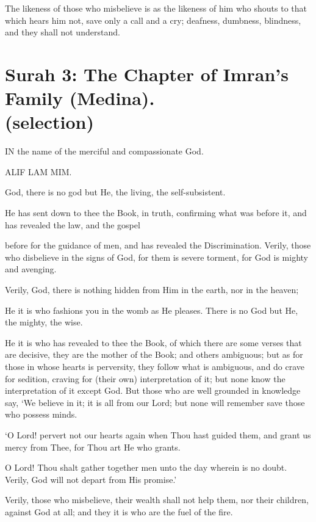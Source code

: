 \documentclass[fontsize=14pt, letterpaper, notitlepage, openany, DIV=12]{scrbook} %
\begin{document}
\noindent[2:171]
The likeness of those who misbelieve is as the likeness of him who shouts to that which
hears him not, save only a call and a cry; deafness, dumbness, blindness, and they shall not
understand.


\section[Surah 3: The Chapter of Imran's Family (Medina).]{Surah 3: The Chapter of Imran's Family (Medina).\\ (selection)}


IN the name of the merciful and compassionate God.

\noindent[3:1]
ALIF LAM MIM.

\noindent[3:2]
God, there is no god but He, the living, the self-subsistent.

\noindent[3:3]
He has sent down to thee the Book, in truth, confirming what was before it, and has
revealed the law, and the gospel

\noindent[3:4]
before for the guidance of men, and has revealed the Discrimination. Verily, those who
disbelieve in the signs of God, for them is severe torment, for God is mighty and avenging.

\noindent[3:5]
Verily, God, there is nothing hidden from Him in the earth, nor in the heaven;

\noindent[3:6]
He it is who fashions you in the womb as He pleases. There is no God but He, the
mighty, the wise.

\noindent[3:7]
He it is who has revealed to thee the Book, of which there are some verses that are
decisive, they are the mother of the Book; and others ambiguous; but as for those in whose hearts
is perversity, they follow what is ambiguous, and do crave for sedition, craving for (their own)
interpretation of it; but none know the interpretation of it except God. But those who are well
grounded in knowledge say, `We believe in it; it is all from our Lord; but none will remember
save those who possess minds.

\noindent[3:8]
`O Lord! pervert not our hearts again when Thou hast guided them, and grant us mercy
from Thee, for Thou art He who grants.

\noindent[3:9]
O Lord! Thou shalt gather together men unto the day wherein is no doubt. Verily, God
will not depart from His promise.'

\noindent[3:10]
Verily, those who misbelieve, their wealth shall not help them, nor their children, against
God at all; and they it is who are the fuel of the fire.
\end{document}
